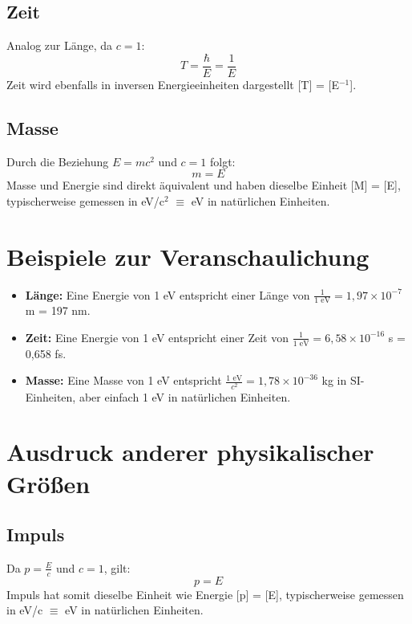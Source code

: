 \documentclass[12pt,a4paper]{article}
\begin{document}
	\subsection{Zeit}
	Analog zur Länge, da $c=1$:
	\begin{equation}
		T = \frac{\hbar}{E} = \frac{1}{E}
	\end{equation}
	Zeit wird ebenfalls in inversen Energieeinheiten dargestellt [T] = [E$^{-1}$].
	
	\subsection{Masse}
	Durch die Beziehung $E = mc^2$ und $c=1$ folgt:
	\begin{equation}
		m = E
	\end{equation}
	Masse und Energie sind direkt äquivalent und haben dieselbe Einheit [M] = [E], typischerweise gemessen in eV/c$^2$ $\equiv$ eV in natürlichen Einheiten.
	
	\section{Beispiele zur Veranschaulichung}
	
	\begin{itemize}
		\item \textbf{Länge:} Eine Energie von 1 eV entspricht einer Länge von $\frac{1}{1\text{ eV}} = 1,97 \times 10^{-7}$ m = 197 nm.
		\item \textbf{Zeit:} Eine Energie von 1 eV entspricht einer Zeit von $\frac{1}{1\text{ eV}} = 6,58 \times 10^{-16}$ s = 0,658 fs.
		\item \textbf{Masse:} Eine Masse von 1 eV entspricht $\frac{1\text{ eV}}{c^2} = 1,78 \times 10^{-36}$ kg in SI-Einheiten, aber einfach 1 eV in natürlichen Einheiten.
	\end{itemize}
	
	\section{Ausdruck anderer physikalischer Größen}
	
	\subsection{Impuls}
	Da $p = \frac{E}{c}$ und $c=1$, gilt:
	\begin{equation}
		p = E
	\end{equation}
	Impuls hat somit dieselbe Einheit wie Energie [p] = [E], typischerweise gemessen in eV/c $\equiv$ eV in natürlichen Einheiten.
	
\end{document}

